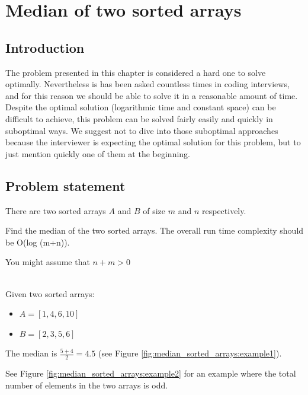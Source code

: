 %

\chapter{Median of two sorted arrays}
\label{ch:median_sorted_arrays}
\section*{Introduction}

The problem presented in this chapter is considered a hard one to solve optimally. Nevertheless is has been asked countless times in coding interviews, and for this reason we should be able to solve it in a reasonable amount of time. Despite the optimal solution (logarithmic time and constant space) can be difficult to achieve, this problem can be solved fairly easily and quickly in suboptimal ways. We suggest not to dive into those suboptimal approaches because the interviewer is expecting the optimal solution for this problem, but to just mention quickly one of them at the beginning.


\section{Problem statement}
\begin{exercise}
There are two sorted arrays $A$ and $B$ of size $m$ and $n$ respectively.

Find the median of the two sorted arrays. The overall run time complexity should be O(log (m+n)).

You might assume that $n+m > 0$

	\begin{example}
		\hfill \\
		Given two sorted arrays:
		\begin{itemize}
			\item $A=[1,4,6,10]$
			\item $B=[2,3,5,6]$
		\end{itemize}
		The median is $\frac{5+4}{2} = 4.5$ (see Figure \ref{fig:median_sorted_arrays:example1}).

		See Figure \ref{fig:median_sorted_arrays:example2} for an example where the total number of elements in the two arrays is odd.
	\end{example}

\end{exercise}

